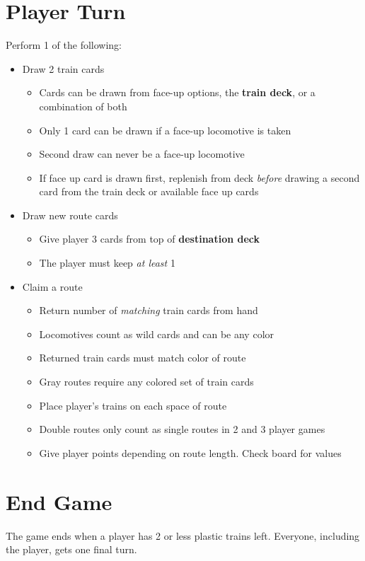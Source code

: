 \documentclass[12pt]{article}
\newenvironment{itemizeCustom}
{\begin{itemize}
  \setlength{\itemsep}{1pt}
  \setlength{\parskip}{0pt}
  \setlength{\parsep}{0pt}}
{\end{itemize}}
\begin{document}
\begin{mdframed}[style = customFrame]
\begin{multicols*}{2}
\section*{Player Turn}
Perform 1 of the following:
\begin{itemizeCustom}
	\item Draw 2 train cards
		\begin{itemizeCustom}
			\item Cards can be drawn from face-up options, the \textbf{train deck}, or a combination of both
			\item Only 1 card can be drawn if a face-up locomotive is taken
			\item Second draw can never be a face-up locomotive 
			\item If face up card is drawn first, replenish from deck \emph{before} drawing a second card from the train deck or available face up cards
		\end{itemizeCustom}
	\item Draw new route cards
		\begin{itemizeCustom}
			\item Give player 3 cards from top of \textbf{destination deck}
			\item The player must keep \emph{at least} 1
		\end{itemizeCustom}
	\item Claim a route
		\begin{itemizeCustom}
			\item Return number of \emph{matching} train cards from hand
			\item Locomotives count as wild cards and can be any color
			\item Returned train cards must match color of route
			\item Gray routes require any colored set of train cards
			\item Place player's trains on each space of route
			\item Double routes only count as single routes in 2 and 3 player games
			\item Give player points depending on route length. Check board for values
		\end{itemizeCustom}
\end{itemizeCustom}

\section*{End Game}
The game ends when a player has 2 or less plastic trains left. Everyone, including the player, gets one final turn.


\end{multicols*}
\end{mdframed}
\end{document}
